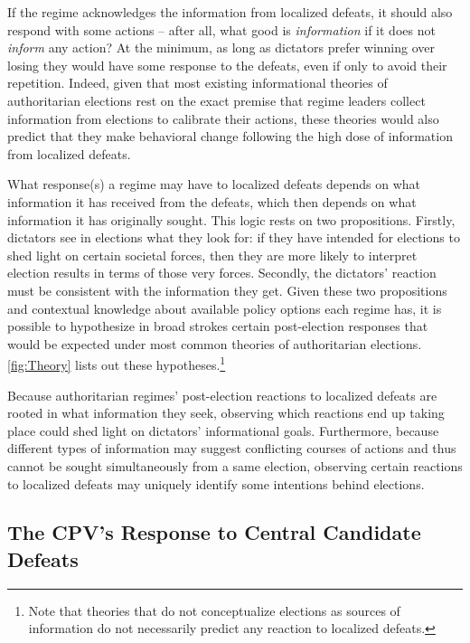 \documentclass[12pt]{article}
\newcommand\fnote[1]{\footnote{\baselineskip=2\normalbaselineskip#1}}
\newcommand{\1}{\mathbbm{1}}
\begin{document}
If the regime acknowledges the information from localized defeats, it should also respond with some actions -- after all, what good is \textit{information} if it does not \textit{inform} any action? At the minimum, as long as dictators prefer winning over losing they would have some response to the defeats, even if only to avoid their repetition. Indeed, given that most existing informational theories of authoritarian elections rest on the exact premise that regime leaders collect information from elections to calibrate their actions, these theories would also predict that they make behavioral change following the high dose of information from localized defeats. 

What response(s) a regime may have to localized defeats depends on what information it has received from the defeats, which then depends on what information it has originally sought. This logic rests on two propositions. Firstly, dictators see in elections what they look for: if they have intended for elections to shed light on certain societal forces, then they are more likely to interpret election results in terms of those very forces. Secondly, the dictators' reaction must be consistent with the information they get. Given these two propositions and contextual knowledge about available policy options each regime has, it is possible to hypothesize in broad strokes certain post-election responses that would be expected under most common theories of authoritarian elections. \autoref{fig:Theory} lists out these hypotheses.\fnote{Note that theories that do not conceptualize elections as sources of information \citep[e.g][]{AR2005, Cox2009} do not necessarily predict any reaction to localized defeats.}

Because authoritarian regimes' post-election reactions to localized defeats are rooted in what information they seek, observing which reactions end up taking place could shed light on dictators' informational goals. Furthermore, because different types of information may suggest conflicting courses of actions and thus cannot be sought simultaneously from a same election, observing certain reactions to localized defeats may uniquely identify some intentions behind elections. 



\subsection{The CPV's Response to Central Candidate Defeats}
\label{sec:vietnam_local_defeat}
\end{document}
